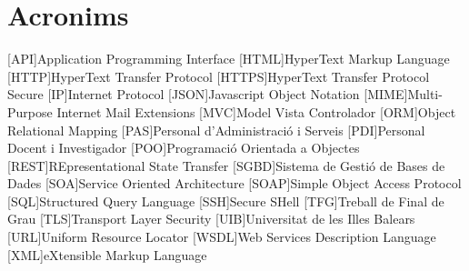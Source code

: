 \chapter{Acronims} 
\begin{acronym}

[API]{Application Programming Interface}
[HTML]{HyperText Markup Language}
[HTTP]{HyperText Transfer Protocol}
[HTTPS]{HyperText Transfer Protocol Secure}
[IP]{Internet Protocol}
[JSON]{Javascript Object Notation}
[MIME]{Multi-Purpose Internet Mail Extensions}
[MVC]{Model Vista Controlador}
[ORM]{Object Relational Mapping}
[PAS]{Personal d'Administració i Serveis}
[PDI]{Personal Docent i Investigador}
[POO]{Programació Orientada a Objectes}
[REST]{REpresentational State Transfer}
[SGBD]{Sistema de Gestió de Bases de Dades}
[SOA]{Service Oriented Architecture}
[SOAP]{Simple Object Access Protocol}
[SQL]{Structured Query Language}
[SSH]{Secure SHell}
[TFG]{Treball de Final de Grau}
[TLS]{Transport Layer Security}
[UIB]{Universitat de les Illes Balears}
[URL]{Uniform Resource Locator}
[WSDL]{Web Services Description Language}
[XML]{eXtensible Markup Language}

\end{acronym}
